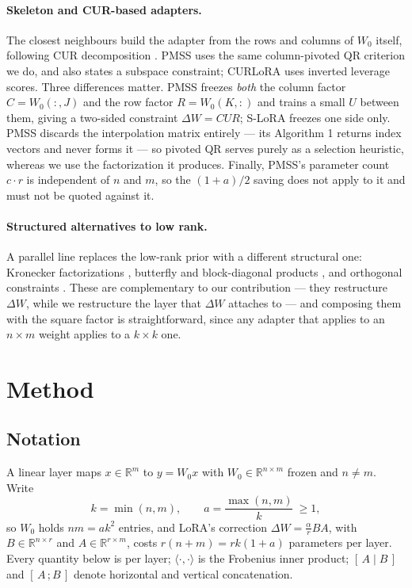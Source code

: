 \documentclass{article}
\theoremstyle{remark}
\begin{document}
\paragraph{Skeleton and CUR-based adapters.}
The closest neighbours build the adapter from the rows and columns of $W_0$
itself, following CUR decomposition \citep{mahoney2009cur}. PMSS
\citep{wang2025pmss} uses the same column-pivoted QR criterion we do, and also
states a subspace constraint; CURLoRA \citep{fawi2024curlora} uses inverted
leverage scores. Three differences matter. PMSS freezes \emph{both} the column
factor $C=W_0(:,J)$ and the row factor $R=W_0(K,:)$ and trains a small $U$
between them, giving a two-sided constraint $\Delta W=CUR$; S-LoRA freezes one
side only. PMSS discards the interpolation matrix entirely --- its Algorithm 1
returns index vectors and never forms it --- so pivoted QR serves purely as a
selection heuristic, whereas we use the factorization it produces. Finally,
PMSS's parameter count $c\cdot r$ is independent of $n$ and $m$, so the
$(1+a)/2$ saving does not apply to it and must not be quoted against it.

\paragraph{Structured alternatives to low rank.}
A parallel line replaces the low-rank prior with a different structural one:
Kronecker factorizations \citep{edalati2022krona}, butterfly and block-diagonal
products \citep{dao2022monarch}, and orthogonal constraints
\citep{qiu2023oft}. These are complementary to our contribution --- they
restructure $\Delta W$, while we restructure the layer that $\Delta W$ attaches
to --- and composing them with the square factor is straightforward, since any
adapter that applies to an $n\times m$ weight applies to a $k\times k$ one.

\section{Method}

\subsection{Notation}
A linear layer maps $x\in\mathbb{R}^{m}$ to $y=W_0x$ with
$W_0\in\mathbb{R}^{n\times m}$ frozen and $n\neq m$. Write
\[
  k=\min(n,m),\qquad a=\frac{\max(n,m)}{k}\ \ge 1,
\]
so $W_0$ holds $nm=ak^2$ entries, and LoRA's correction
$\Delta W=\tfrac{\alpha}{r}BA$, with $B\in\mathbb{R}^{n\times r}$ and
$A\in\mathbb{R}^{r\times m}$, costs $r(n+m)=rk(1+a)$ parameters per layer.
Every quantity below is per layer; $\langle\cdot,\cdot\rangle$ is the Frobenius
inner product; $[\,A\mid B\,]$ and $[\,A\,;B\,]$ denote horizontal and vertical
concatenation.
\end{document}
